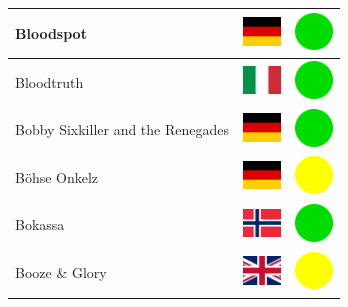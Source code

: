 \documentclass[12pt, a4paper, twoside]{report}
\begin{document}
\begin{center}
\begin{longtable}{|p{5cm}|p{2cm}|p{2cm}|}
Bloodspot & \includegraphics[width=1cm]{4x3/de} & \includegraphics[width=1cm]{likes/y} \\ \hline
Bloodtruth & \includegraphics[width=1cm]{4x3/it} & \includegraphics[width=1cm]{likes/y} \\ \hline
Bobby Sixkiller and the Renegades & \includegraphics[width=1cm]{4x3/de} & \includegraphics[width=1cm]{likes/y} \\ \hline
Böhse Onkelz & \includegraphics[width=1cm]{4x3/de} & \includegraphics[width=1cm]{likes/m} \\ \hline
Bokassa & \includegraphics[width=1cm]{4x3/no} & \includegraphics[width=1cm]{likes/y} \\ \hline
Booze \& Glory & \includegraphics[width=1cm]{4x3/gb} & \includegraphics[width=1cm]{likes/m} \\ \hline

\end{longtable}
\end{center}
\end{document}
